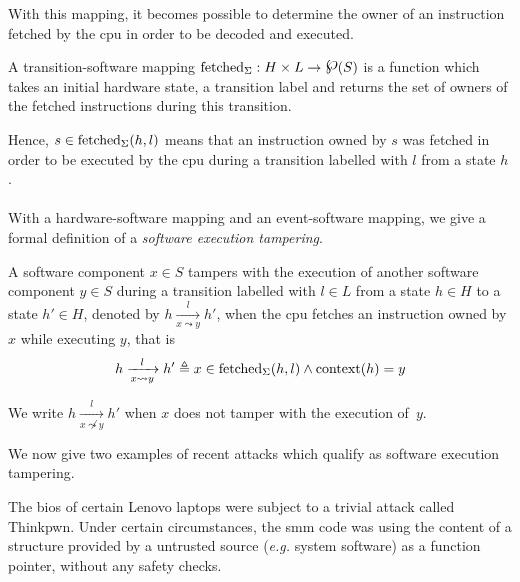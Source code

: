 With this mapping, it becomes possible to determine the owner of an instruction
fetched by the \ac{cpu} in order to be decoded and executed.

\begin{definition}
  \label{def:minx86:transsoft}
  A transition-software mapping
  $\func{fetched}_{\Sigma}: H \times L \rightarrow \powerset(S)$ is a function
  which takes an initial hardware state, a transition label and returns the set
  of owners of the fetched instructions during this transition.
\end{definition}

Hence, $s \in \mathrm{fetched}_{\Sigma}(h, l)$ means that an instruction owned by
$s$ was fetched in order to be executed by the \ac{cpu} during a transition
labelled with $l$ from a state $h$.

\paragraph{}
%
With a hardware-software mapping and an event-software mapping, we give a formal
definition of a \textit{software execution tampering}.

\begin{definition}
  \label{def:speccert:tempering}
  A software component $x \in S$ tampers with the execution of another software
  component $y \in S$ during a transition labelled with $l \in L$ from a state
  $h \in H$ to a state $h' \in H$, denoted by
  $h \xrightarrow[x \leadsto y]{l} h'$, when the \ac{cpu} fetches an instruction
  owned by $x$ while executing $y$, that is
  \[
    h \xrightarrow[x \leadsto y]{l} h' \triangleq x \in
    \mathrm{fetched}_{\Sigma}(h, l) \wedge \mathrm{context}(h) = y
  \]

  We write $h \xrightarrow[x \not\leadsto y]{l} h'$ when $x$ does not tamper
  with the execution of~$y$.
\end{definition}

We now give two examples of recent attacks which qualify as software execution
tampering.

\begin{example}[Thinkpwn]
  The \ac{bios} of certain Lenovo laptops were subject to a trivial attack
  called Thinkpwn.
  Under certain circumstances, the \ac{smm} code was using the content of a
  structure provided by a untrusted source (\emph{e.g.} system software) as a
  function pointer, without any safety checks.
\end{example}

